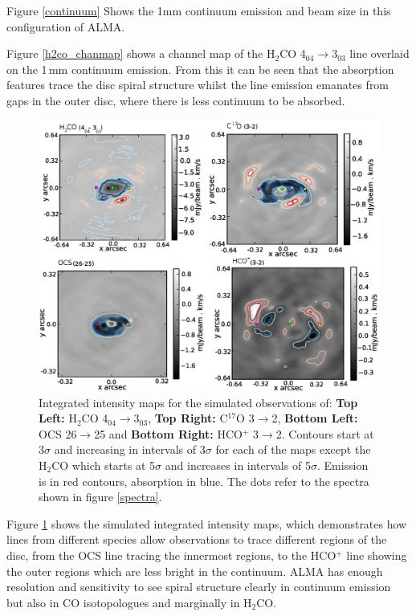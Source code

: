 \documentclass[useAMS,usenatbib]{mn2e}
\begin{document}
Figure \ref{continuum} Shows the 1mm continuum emission and beam size in this configuration of ALMA. 

Figure \ref{h2co_chanmap} shows a channel map of the H$_2$CO 4$_{04}\rightarrow$3$_{03}$ line overlaid on the 1$\,$mm continuum emission. From this it can be seen that the absorption features trace the disc spiral structure whilst the line emission emanates from gaps in the outer disc, where there is less continuum to be absorbed.\smallskip


\begin{figure}
 \includegraphics[width=168mm]{Figures/sim/casa_all_30deg_contSub_dots.eps}
 \caption{Integrated intensity maps for the simulated observations of: {\bf Top Left:} H$_2$CO 4$_{04}\rightarrow$3$_{03}$, {\bf Top Right:} C$^{17}$O 3$\rightarrow$2, {\bf Bottom Left:} OCS 26$\rightarrow$25 and {\bf Bottom Right:} HCO$^+$ 3$\rightarrow$2. Contours start at 3$\sigma$ and increasing in intervals of 3$\sigma$ for each of the maps except the H$_2$CO which starts at 5$\sigma$ and increases in intervals of 5$\sigma$. Emission is in red contours, absorption in blue. The dots refer to the spectra shown in figure \ref{spectra}.}
\label{mom0_maps}
\end{figure}

Figure \ref{mom0_maps} shows the simulated integrated intensity maps, which demonstrates how lines from different species allow observations to trace different regions of the disc, from the OCS line tracing the innermost regions, to the HCO$^+$ line showing the outer regions which are less bright in the continuum. ALMA has enough resolution and sensitivity to see spiral structure clearly in continuum emission but also in CO isotopologues and marginally in H$_2$CO.\smallskip
\end{document}
